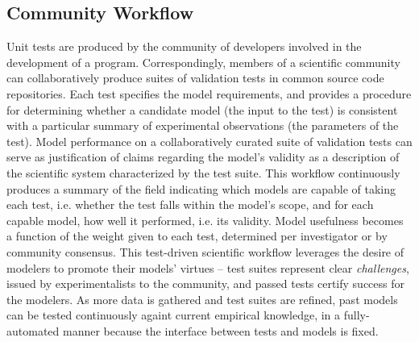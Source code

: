 \documentclass[11pt,letterpaper]{article}
\begin{document}
\subsection{Community Workflow}
Unit tests are produced by the community of developers involved in the development of a program. Correspondingly, members of a scientific community can collaboratively produce suites of validation tests in common source code repositories. Each test specifies the model requirements, and provides a procedure for determining whether a candidate model (the input to the test) is consistent with a particular summary of experimental observations (the parameters of the test). Model performance on a collaboratively curated suite of validation tests can serve as justification of claims regarding the model's validity as a description of the scientific system characterized by the test suite. This workflow continuously produces a summary of the field indicating which models are capable of taking each test, i.e. whether the test falls within the model's scope, and for each capable model, how well it performed, i.e. its validity.  Model usefulness becomes a function of the weight given to each test, determined per investigator or by community consensus. This test-driven scientific workflow leverages the desire of modelers to promote their models' virtues -- test suites represent clear \emph{challenges}, issued by experimentalists to the community, and passed tests certify success for the modelers. As more data is gathered and test suites are refined, past models can be tested continuously againt current empirical knowledge, in a fully-automated manner because the interface between tests and models is fixed.  
\end{document}
